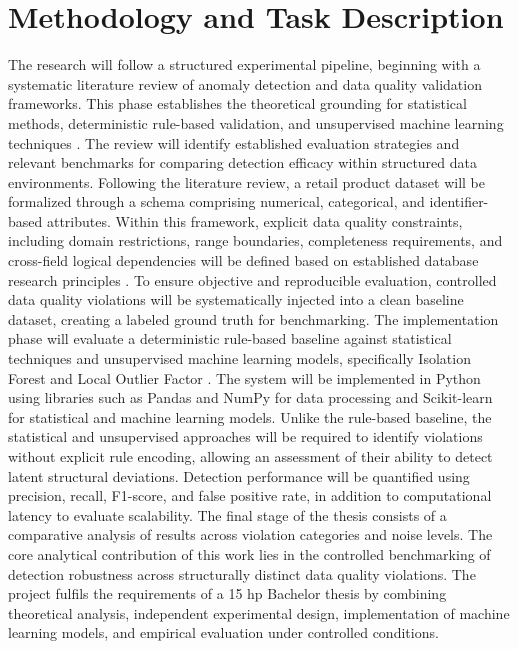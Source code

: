 \documentclass[a4paper, 12pt]{article} %
\begin{document}
\section{Methodology and Task Description}
The research will follow a structured experimental pipeline, beginning with a systematic literature review of anomaly detection and data quality validation frameworks. This phase establishes the theoretical grounding for statistical methods, deterministic rule-based validation, and unsupervised machine learning techniques \cite{chandola2009anomaly, aggarwal2017outlier}. The review will identify established evaluation strategies and relevant benchmarks for comparing detection efficacy within structured data environments.
Following the literature review, a retail product dataset will be formalized through a schema comprising numerical, categorical, and identifier-based attributes. Within this framework, explicit data quality constraints, including domain restrictions, range boundaries, completeness requirements, and cross-field logical dependencies will be defined based on established database research principles \cite{rahm2000data, fan2008dependencies}. To ensure objective and reproducible evaluation, controlled data quality violations will be systematically injected into a clean baseline dataset, creating a labeled ground truth for benchmarking.
The implementation phase will evaluate a deterministic rule-based baseline against statistical techniques and unsupervised machine learning models, specifically Isolation Forest \cite{liu2008isolation} and Local Outlier Factor \cite{breunig2000lof}. The system will be implemented in Python using libraries such as Pandas and NumPy for data processing and Scikit-learn for statistical and machine learning models. Unlike the rule-based baseline, the statistical and unsupervised approaches will be required to identify violations without explicit rule encoding, allowing an assessment of their ability to detect latent structural deviations.
Detection performance will be quantified using precision, recall, F1-score, and false positive rate, in addition to computational latency to evaluate scalability. The final stage of the thesis consists of a comparative analysis of results across violation categories and noise levels. The core analytical contribution of this work lies in the controlled benchmarking of detection robustness across structurally distinct data quality violations.
The project fulfils the requirements of a 15 hp Bachelor thesis by combining theoretical analysis, independent experimental design, implementation of machine learning models, and empirical evaluation under controlled conditions.
\end{document}
